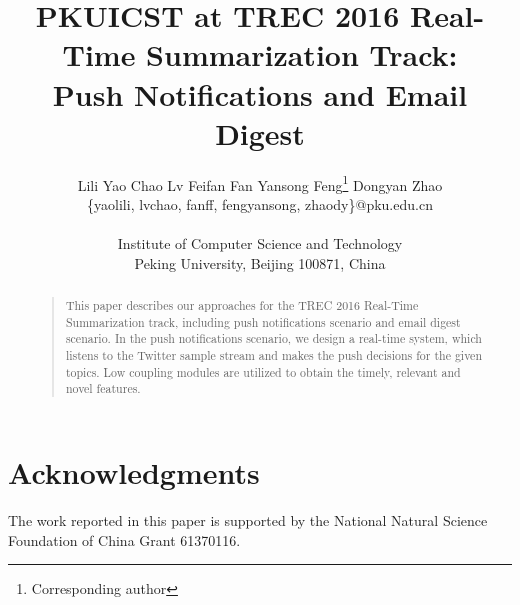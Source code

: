 \documentclass[letterpaper]{article}
\begin{document}
%
\title{PKUICST at TREC 2016 Real-Time Summarization Track: \\
Push Notifications and Email Digest
}
\author{Lili Yao \quad Chao Lv \quad Feifan Fan \quad Yansong Feng\footnote{Corresponding author} \quad Dongyan Zhao\\
\{yaolili, lvchao, fanff, fengyansong, zhaody\}@pku.edu.cn\\
\\
Institute of Computer Science and Technology\\
Peking University, Beijing 100871, China\\
}

\maketitle
\begin{abstract}
\begin{quote}
This paper describes our approaches for the TREC 2016 Real-Time Summarization track,
including push notifications scenario and email digest scenario.
In the push notifications scenario, we design a real-time system, which listens to the Twitter sample stream
and makes the push decisions for the given topics.
Low coupling modules are utilized to obtain the timely, relevant and novel features.




\end{quote}
\end{abstract}






\section{Acknowledgments}
The work reported in this paper is supported by the National Natural Science Foundation of China Grant 61370116.
%



\end{document}
